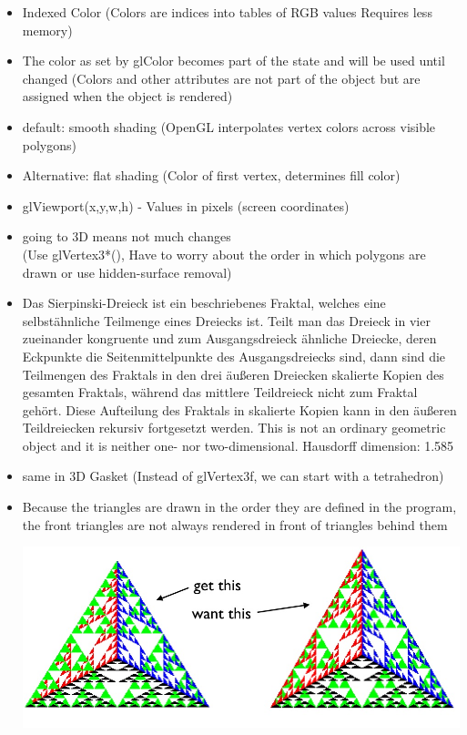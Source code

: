 \documentclass[11pt,a4paper]{article}
\begin{document}
\begin{itemize}
			\item Indexed Color (Colors are indices into tables of RGB values Requires less memory)
			\item The color as set by glColor becomes part of the state and will be used until changed (Colors and other attributes are not part of the object but are assigned when the object is rendered)
			\item default: smooth shading (OpenGL interpolates vertex colors across visible polygons)
			\item Alternative: flat shading (Color of first vertex, determines fill color)
			\item glViewport(x,y,w,h) - Values in pixels (screen coordinates)
			\item going to 3D means not much changes\\
			(Use glVertex3*(), Have to worry about the order in which polygons are drawn or use hidden-surface removal)
			\item Das Sierpinski-Dreieck ist ein beschriebenes Fraktal, welches eine selbstähnliche Teilmenge eines Dreiecks ist. Teilt man das Dreieck in vier zueinander kongruente und zum Ausgangsdreieck ähnliche Dreiecke, deren Eckpunkte die Seitenmittelpunkte des Ausgangsdreiecks sind, dann sind die Teilmengen des Fraktals in den drei äußeren Dreiecken skalierte Kopien des gesamten Fraktals, während das mittlere Teildreieck nicht zum Fraktal gehört. Diese Aufteilung des Fraktals in skalierte Kopien kann in den äußeren Teildreiecken rekursiv fortgesetzt werden. 
			This is not an ordinary geometric object and it is neither one- nor two-dimensional. Hausdorff dimension: 1.585	
			\item same in 3D Gasket (Instead of glVertex3f, we can start with a tetrahedron)
			\item Because the triangles are drawn in the order they are defined in the program, the front triangles are not always rendered in front of triangles behind them\\
			\begin{center}
				\includegraphics[scale=0.5]{pictures/AlmostCorrect.jpg}

\end{center}
\end{itemize}
\end{document}
